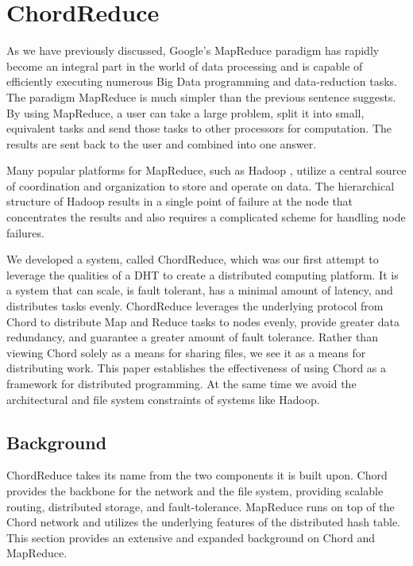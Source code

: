 \chapter{ChordReduce}
\label{chapter:chordreduce}

As we have previously discussed, Google's MapReduce \cite{mapreduce} paradigm has rapidly become an integral part in the world of data processing and is capable of efficiently executing numerous Big Data programming and data-reduction tasks.  
The paradigm MapReduce is much simpler than the previous sentence suggests.
By using MapReduce, a user can take a large problem, split it into small, equivalent tasks and send those tasks to other processors for computation.  
The results are sent back to the user and combined into one answer.  

Many popular platforms for MapReduce, such as Hadoop \cite{hadoop}, utilize a central source of coordination and organization to store and operate on data.
The hierarchical structure of Hadoop results in a single point of failure at the node that concentrates the results and also requires a complicated scheme for handling node failures.

We developed a system, called ChordReduce, which was our first attempt to leverage the qualities of a DHT to create a distributed computing platform.  
It is a system that can scale, is fault tolerant, has a minimal amount of latency, and distributes tasks evenly.  
ChordReduce leverages the underlying protocol from Chord \cite{chord} to distribute Map and Reduce tasks to nodes evenly, provide greater data redundancy, and guarantee a greater amount of fault tolerance. 
Rather than viewing Chord solely as a means for sharing files, we see it as a means for distributing work. This paper establishes the effectiveness of using Chord as a framework for distributed programming. At the same time we avoid the architectural and file system constraints of systems like Hadoop.  


\section{Background}
ChordReduce takes its name from the two components it is built upon.
Chord \cite{chord} provides the backbone for the network and the file system, providing scalable routing, distributed storage, and fault-tolerance.   
MapReduce runs on top of the Chord network and utilizes the underlying features of the distributed hash table.  This section provides an extensive and expanded background on Chord and MapReduce.


